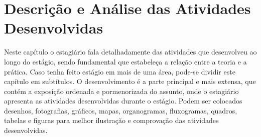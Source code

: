 \chapter{Descrição e Análise das Atividades Desenvolvidas}
\label{cap:descricao}

Neste capítulo o estagiário fala detalhadamente das atividades que desenvolveu ao longo do estágio, sendo fundamental que estabeleça a relação entre a teoria e a prática. Caso tenha feito estágio em mais de uma área, pode-se dividir este capítulo em subtítulos. 
O desenvolvimento é a parte principal e mais extensa, que contém a exposição ordenada e pormenorizada do assunto, onde o estagiário apresenta as atividades desenvolvidas durante o estágio. Podem ser colocados desenhos, fotografias, gráficos, mapas, organogramas, fluxogramas, quadros, tabelas e figuras para melhor ilustração e comprovação das atividades desenvolvidas.
